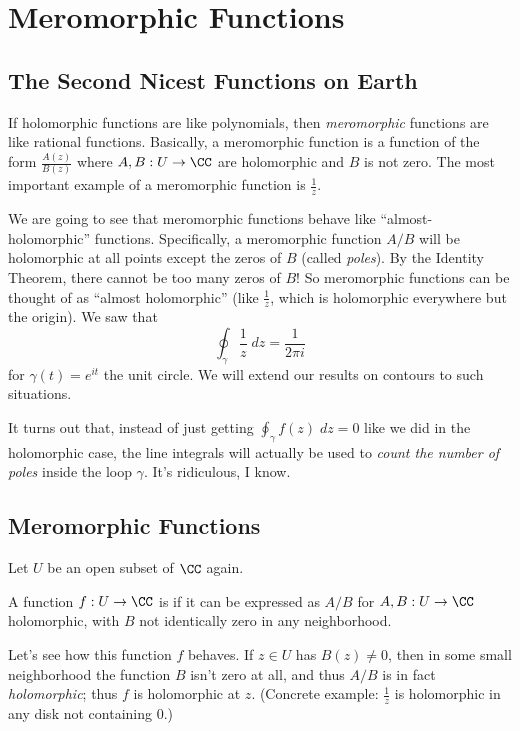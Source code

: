 \chapter{Meromorphic Functions}
\section{The Second Nicest Functions on Earth}
If holomorphic functions are like polynomials,
then \emph{meromorphic} functions are like rational functions.
Basically, a meromorphic function is a function of the form
$ \frac{A(z)}{B(z)} $
where $A , B:  U \to \CC$ are holomorphic and $B$ is not zero.
The most important example of a meromorphic function is $\frac 1z$.

We are going to see that meromorphic functions behave
like ``almost-holomorphic'' functions.
Specifically, a meromorphic function $A/B$ will be holomorphic at all points 
except the zeros of $B$ (called \emph{poles}).
By the Identity Theorem, there cannot be too many zeros of $B$!
So meromorphic functions can be thought of as ``almost holomorphic''
(like $\frac 1z$, which is holomorphic everywhere but the origin).
We saw that
\[
	\oint_{\gamma} \frac 1z \; dz
	= \frac{1}{2\pi i}
\]
for $\gamma(t) = e^{it}$ the unit circle.
We will extend our results on contours to such situations.

It turns out that, instead of just getting $\oint_\gamma f(z) \; dz = 0$ like we did in
the holomorphic case, the line integrals will actually be used to \emph{count the number of poles}
inside the loop $\gamma$. It's ridiculous, I know.

\section{Meromorphic Functions}

Let $U$ be an open subset of $\CC$ again.
\begin{definition}
	A function $f : U \to \CC$ is  if it can be expressed as $A/B$
	for $A, B : U \to \CC$ holomorphic, with $B$ not identically zero in any neighborhood.
\end{definition}
Let's see how this function $f$ behaves.
If $z \in U$ has $B(z) \neq 0$, then in some small neighborhood the function $B$ isn't zero
at all, and thus $A/B$ is in fact \emph{holomorphic}; thus $f$ is holomorphic at $z$.
(Concrete example: $\frac 1z$ is holomorphic in any disk not containing $0$.)

